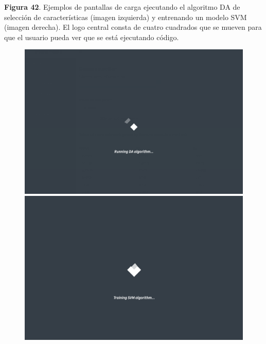 \newpage
\begin{center}
	\textbf{Figura 42}. Ejemplos de pantallas de carga ejecutando el algoritmo DA de selección de características (imagen izquierda) y entrenando un modelo SVM (imagen derecha). El logo central consta de cuatro cuadrados que se mueven para que el usuario pueda ver que se está ejecutando código.
	
	
	\begin{figure}[H]
		\centering
		\begin{minipage}{.5\textwidth}
			\centering
			\includegraphics[width=.95\textwidth]{figuras/42_spinner_2.png}
		\end{minipage}%
		\begin{minipage}{.5\textwidth}
			\centering
			\includegraphics[width=.95\textwidth]{figuras/42_spinner_1.png}
		\end{minipage}
	\end{figure}
	
\end{center}

